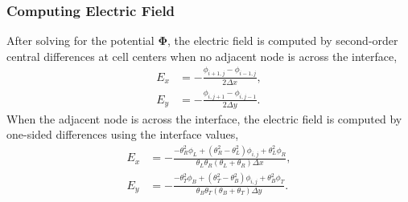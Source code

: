 \subsubsection{Computing Electric Field}
After solving for the potential $\mathbf{\Phi}$, the electric field is computed by second-order central differences at cell centers when no adjacent node is across the interface,
\begin{equation}
	\begin{aligned}
		E_x & = -\frac{\phi_{i+1,j} - \phi_{i-1,j}}{2\Delta x}, \\
		E_y & = -\frac{\phi_{i,j+1} - \phi_{i,j-1}}{2\Delta y}.
	\end{aligned}
\end{equation}
When the adjacent node is across the interface, the electric field is computed by one-sided differences using the interface values, \cite{cho2019second}
\begin{equation}
	\begin{aligned}
		E_x & = -\frac{-\theta_R^2\phi_L + (\theta_R^2 - \theta_L^2)\phi_{i,j} + \theta_L^2\phi_R}{\theta_L\theta_R (\theta_L + \theta_R) \Delta x}, \\
		E_y & = -\frac{-\theta_T^2\phi_B + (\theta_T^2 - \theta_B^2)\phi_{i,j} + \theta_B^2\phi_T}{\theta_B\theta_T (\theta_B + \theta_T) \Delta y}.
	\end{aligned}
\end{equation}
